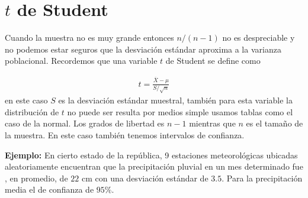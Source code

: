 \documentclass{assignment}
\begin{document}
\section{$t$ de Student}
Cuando la muestra no es muy grande entonces $n/(n-1)$ no es despreciable y no podemos estar seguros que la desviación estándar aproxima a la varianza poblacional. Recordemos que una variable $t$ de Student se define como

\begin{align*}
t = \frac{\overline{X} - \mu}{S/\sqrt{n}}
\end{align*}
en este caso $S$ es la desviación estándar muestral, también para esta variable la distribución de $t$ no puede ser resulta por medios simple usamos tablas como el caso de la normal. Los grados de libertad es $n-1$ mientras que $n$ es el tamaño de la muestra. En este caso también tenemos intervalos de confianza. 


\textbf{Ejemplo:}
En cierto estado de la república, 9 estaciones meteorológicas ubicadas aleatoriamente encuentran que la precipitación pluvial en un mes determinado fue , en promedio, de $22$ cm con una desviación estándar de $3.5.$ Para la  precipitación media el   de confianza de $95\%$.
\end{document}
